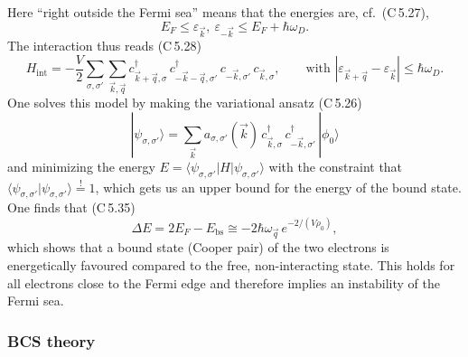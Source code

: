 \documentclass[../../main.tex]{subfiles}
\begin{document}
Here ``right outside the Fermi sea'' means that the energies are, cf.\ (C\,5.27),
\begin{equation}
E_F\le\varepsilon_{\vec k},\ \varepsilon_{-\vec k}\le E_F+\hbar\omega_D .
\label{eq:shell}
\end{equation}
The interaction thus reads (C\,5.28)
\begin{equation}
H_{\mathrm{int}} = -\frac V2\sum_{\sigma,\sigma'}\sum_{\vec k,\vec q}
  c^\dagger_{\vec k+\vec q,\sigma}\,c^\dagger_{-\vec k-\vec q,\sigma'}\,
  c_{-\vec k,\sigma'}\,c_{\vec k,\sigma},
  \qquad\text{with }
  |\varepsilon_{\vec k+\vec q}-\varepsilon_{\vec k}|\le\hbar\omega_D .
\label{eq:cooper-int}
\end{equation}
One solves this model by making the variational ansatz (C\,5.26)
\begin{equation}
|\psi_{\sigma,\sigma'}\rangle = \sum_{\vec k}a_{\sigma,\sigma'}(\vec k)\,
  c^\dagger_{\vec k,\sigma}\,c^\dagger_{-\vec k,\sigma'}\,|\phi_0\rangle
\label{eq:cooper-ansatz}
\end{equation}
and minimizing the energy
$E=\langle\psi_{\sigma,\sigma'}|H|\psi_{\sigma,\sigma'}\rangle$ with the constraint that
$\langle\psi_{\sigma,\sigma'}|\psi_{\sigma,\sigma'}\rangle\stackrel{!}{=}1$, which gets us
an upper bound for the energy of the bound state. One finds that (C\,5.35)
\begin{equation}
\Delta E = 2E_F-E_{\mathrm{bs}} \cong -2\hbar\omega_{\vec q}\,e^{-2/(V\rho_0)},
\label{eq:cooper-binding}
\end{equation}
which shows that a bound state (Cooper pair) of the two electrons is
energetically favoured compared to the free, non-interacting state. This holds for all
electrons close to the Fermi edge and therefore implies an instability of the Fermi sea.

\subsubsection{BCS theory}
\label{subsubsec:bcs-theory_overview}
\end{document}
